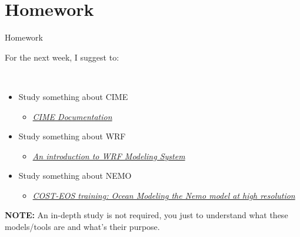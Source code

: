 \section{Homework}

\begin{frame}{Homework}

For the next week, I suggest to:

\

\begin{itemize}
    \item Study something about CIME
    \begin{itemize}
        \item[\faExternalLink] \href{https://esmci.github.io/cime/versions/master/html/index.html}{\textit{CIME Documentation}}
    \end{itemize}
    \item Study something about WRF
    \begin{itemize}
        \item[\faYoutube] \href{https://www.youtube.com/watch?v=wzSu-343b-0}{\textit{An introduction to WRF Modeling System}}
    \end{itemize}
    \item Study something about NEMO
    \begin{itemize}
        \item[\faYoutube] \href{https://www.youtube.com/watch?v=c9Yo-daXnOM}{\textit{COST-EOS training: Ocean Modeling the Nemo model at high resolution}}
    \end{itemize}
    
\end{itemize}
    
\vfill
    
\textbf{NOTE:} An in-depth study is not required, you just to understand what these models/tools are and what's their purpose.
    
\end{frame}
